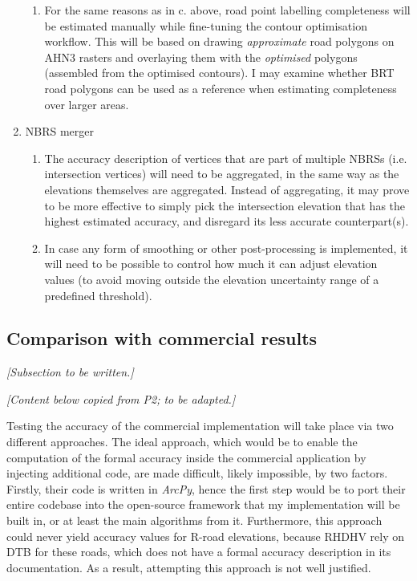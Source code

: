 \begin{enumerate}
\begin{enumerate}
        \item For the same reasons as in c. above, road point labelling completeness will be estimated manually while fine-tuning the contour optimisation workflow. This will be based on drawing \textit{approximate} road polygons on AHN3 rasters and overlaying them with the \textit{optimised} polygons (assembled from the optimised contours). I may examine whether BRT road polygons can be used as a reference when estimating completeness over larger areas.
    \end{enumerate}
    \item NBRS merger
    \begin{enumerate}
        \item The accuracy description of vertices that are part of multiple NBRSs (i.e. intersection vertices) will need to be aggregated, in the same way as the elevations themselves are aggregated. Instead of aggregating, it may prove to be more effective to simply pick the intersection elevation that has the highest estimated accuracy, and disregard its less accurate counterpart(s).
        \item In case any form of smoothing or other post-processing is implemented, it will need to be possible to control how much it can adjust elevation values (to avoid moving outside the elevation uncertainty range of a predefined threshold).
    \end{enumerate}
\end{enumerate}

\subsection{Comparison with commercial results}
\label{sub:comparisonoverview}

\textit{[Subsection to be written.]}

\textit{[Content below copied from P2; to be adapted.]}

Testing the accuracy of the commercial implementation will take place via two different approaches. The ideal approach, which would be to enable the computation of the formal accuracy inside the commercial application by injecting additional code, are made difficult, likely impossible, by two factors. Firstly, their code is written in \textit{ArcPy}, hence the first step would be to port their entire codebase into the open-source framework that my implementation will be built in, or at least the main algorithms from it. Furthermore, this approach could never yield accuracy values for R-road elevations, because RHDHV rely on DTB for these roads, which does not have a formal accuracy description in its documentation. As a result, attempting this approach is not well justified.


